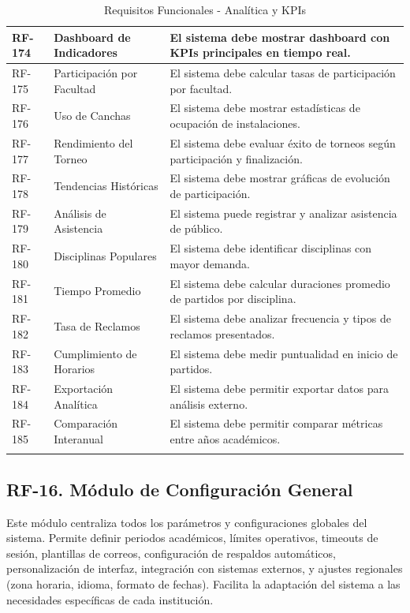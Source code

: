 \documentclass[12pt,a4paper]{article}
\begin{document}
\begin{longtable}{|>{\centering\arraybackslash}p{1.5cm}|>{\raggedright\arraybackslash}p{3.5cm}|>{\raggedright\arraybackslash}p{9cm}|}
RF-174 & Dashboard de Indicadores & El sistema debe mostrar dashboard con KPIs principales en tiempo real. \\
\hline
\rowcolor{rowgray}
RF-175 & Participación por Facultad & El sistema debe calcular tasas de participación por facultad. \\
\hline
RF-176 & Uso de Canchas & El sistema debe mostrar estadísticas de ocupación de instalaciones. \\
\hline
\rowcolor{rowgray}
RF-177 & Rendimiento del Torneo & El sistema debe evaluar éxito de torneos según participación y finalización. \\
\hline
RF-178 & Tendencias Históricas & El sistema debe mostrar gráficas de evolución de participación. \\
\hline
\rowcolor{rowgray}
RF-179 & Análisis de Asistencia & El sistema puede registrar y analizar asistencia de público. \\
\hline
RF-180 & Disciplinas Populares & El sistema debe identificar disciplinas con mayor demanda. \\
\hline
\rowcolor{rowgray}
RF-181 & Tiempo Promedio & El sistema debe calcular duraciones promedio de partidos por disciplina. \\
\hline
RF-182 & Tasa de Reclamos & El sistema debe analizar frecuencia y tipos de reclamos presentados. \\
\hline
\rowcolor{rowgray}
RF-183 & Cumplimiento de Horarios & El sistema debe medir puntualidad en inicio de partidos. \\
\hline
RF-184 & Exportación Analítica & El sistema debe permitir exportar datos para análisis externo. \\
\hline
\rowcolor{rowgray}
RF-185 & Comparación Interanual & El sistema debe permitir comparar métricas entre años académicos. \\
\hline
\caption{Requisitos Funcionales - Analítica y KPIs}
\end{longtable}

\subsection{RF-16. Módulo de Configuración General}

Este módulo centraliza todos los parámetros y configuraciones globales del sistema. Permite definir periodos académicos, límites operativos, timeouts de sesión, plantillas de correos, configuración de respaldos automáticos, personalización de interfaz, integración con sistemas externos, y ajustes regionales (zona horaria, idioma, formato de fechas). Facilita la adaptación del sistema a las necesidades específicas de cada institución.
\end{document}
